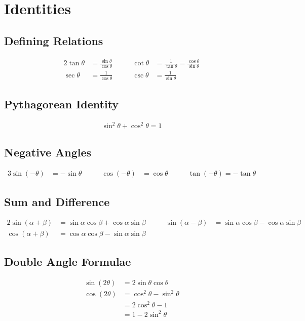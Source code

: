 \documentclass[\main/notes.tex]{subfiles}
\begin{document}
	\section{Identities}
		\subsection{Defining Relations}
			\begin{alignat*}{2}
				\tan \theta &= \frac{\sin\theta}{\cos\theta} \qquad & \cot \theta &= \frac{1}{\tan\theta} = \frac{\cos\theta}{\sin\theta}\\
				\sec\theta &= \frac{1}{\cos\theta} \qquad & \csc\theta &= \frac{1}{\sin\theta}
			\end{alignat*}
		\subsection{Pythagorean Identity}
			\begin{align*}
				\sin^{2}\theta + \cos^{2}\theta = 1
			\end{align*}
		\subsection{Negative Angles}
			\begin{alignat*}{3}
				\sin(-\theta) &= -\sin\theta \qquad & \cos(-\theta) &= \cos\theta \qquad & \tan(-\theta) = -\tan\theta
			\end{alignat*}
		\subsection{Sum and Difference}
			\begin{alignat*}{2}
				\sin(\alpha + \beta) &= \sin\alpha\cos\beta + \cos\alpha\sin\beta \qquad &
				\sin(\alpha - \beta) &= \sin\alpha\cos\beta - \cos\alpha\sin\beta\\
				\cos(\alpha + \beta) &= \cos\alpha\cos\beta - \sin\alpha\sin\beta
			\end{alignat*}
		\subsection{Double Angle Formulae}
			\begin{align*}
				\sin(2\theta) &= 2\sin\theta\cos\theta\\
				\cos(2\theta) &= \cos^{2}\theta - \sin^{2}\theta\\
				&= 2\cos^{2}\theta - 1\\
				&= 1 - 2\sin^{2}\theta
			\end{align*}

\end{document}
